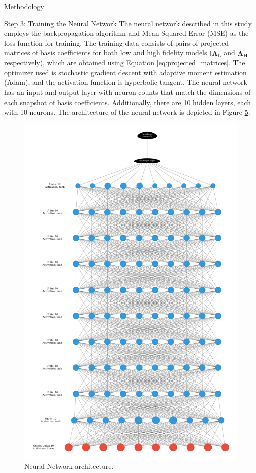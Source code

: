 \begin{frame}{Methodology}
\begin{block}{Step 3: Training the Neural Network}
\protect\hypertarget{step-3-training-the-neural-network}{}
The neural network described in this study employs the backpropagation
algorithm and Mean Squared Error (MSE) as the loss function for
training. The training data consists of pairs of projected matrices of
basis coefficients for both low and high fidelity models
(\(\tilde{\mathbf{\Lambda_L}}\) and \(\tilde{\mathbf{\Lambda_H}}\)
respectively), which are obtained using Equation
\protect\hyperlink{eq:projected_matrices}{{[}eq:projected\_matrices{]}}.
The optimizer used is stochastic gradient descent with adaptive moment
estimation (Adam), and the activation function is hyperbolic tangent.
The neural network has an input and output layer with neuron counts that
match the dimensions of each snapshot of basis coefficients.
Additionally, there are 10 hidden layers, each with 10 neurons. The
architecture of the neural network is depicted in Figure
\protect\hyperlink{fig:nn}{5}.

\begin{figure}
\hypertarget{fig:nn}{%
\centering
\includegraphics{figures/nn.pdf}
\caption{Neural Network architecture.}\label{fig:nn}
}
\end{figure}


\end{block}
\end{frame}
